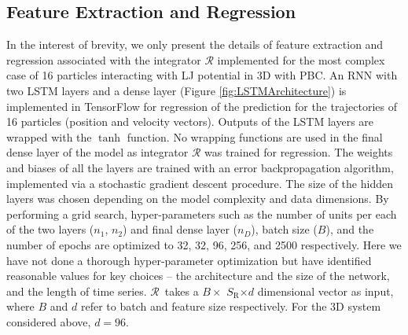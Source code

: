 \documentclass[aps,prl,twocolumn,superscriptaddress,tightenlines,longbibliography, reprint]{revtex4-1}
\newcommand{\R}{$\mathscr{R}$}
\newcommand{\SR}{$S_{\mathrm{R}}$}
\begin{document}
\subsection{Feature Extraction and Regression}
In the interest of brevity, we only present the details of feature extraction and regression associated with the integrator $\mathscr{R}$ implemented for the most complex case of 16 particles interacting with LJ potential in 3D with PBC. An RNN with two LSTM layers and a dense layer (Figure \ref{fig:LSTMArchitecture}) is implemented in TensorFlow for regression of the prediction for the trajectories of 16 particles (position and velocity vectors). Outputs of the LSTM layers are wrapped with the $\tanh$ function. No wrapping functions are used in the final dense layer of the model as integrator $\mathscr{R}$ was trained for regression. The weights and biases of all the layers are trained with an error backpropagation algorithm, implemented via a stochastic gradient descent procedure. 
The size of the hidden layers was chosen depending on the model complexity and data dimensions. By performing a grid search, hyper-parameters such as the number of units per each of the two layers ($n_1$, $n_2$) and final dense layer ($n_D$), batch size ($B$), and the number of epochs are optimized to 32, 32, 96, 256, and 2500 respectively. 
Here we have not done a thorough hyper-parameter optimization but have identified reasonable values for key choices -- the architecture and the size of the network, and the length of time series.
\R\ takes a $B \times$ \SR $\times d$ dimensional vector as input, where $B$ and $d$ refer to batch and feature size respectively. For the 3D system considered above, $d=96$.
\end{document}

